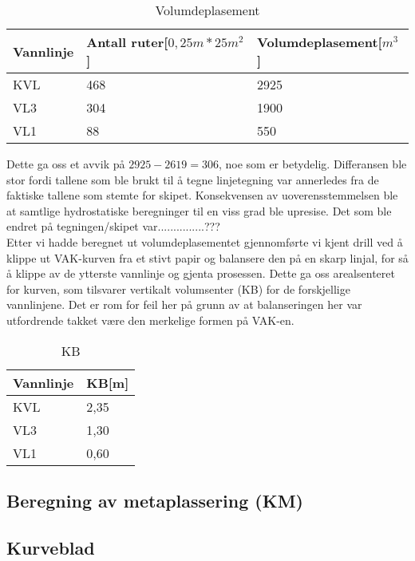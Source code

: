 \documentclass[norsk]{article}
\begin{document}
\begin{table}[htbp]
	\centering
    \caption{Volumdeplasement}
    \label{tab:tableVDP}
    \hskip-3.0cm
    \begin{tabular}{l|l|l} 
      \hline
      \textbf{Vannlinje} &  \textbf{Antall ruter[$0,25m*25m^2$]} & \textbf{Volumdeplasement[$m^3$]} \\ \hline
      KVL & 468 & 2925 \\ \hline
      VL3 & 304 & 1900\\ \hline
      VL1 & 88 & 550 \\ \hline
    \end{tabular}
\end{table}

Dette ga oss et avvik på $2925-2619=306$, noe som er betydelig. Differansen ble stor fordi tallene som ble brukt til å tegne linjetegning var annerledes fra de faktiske tallene som stemte for skipet. Konsekvensen av uoverensstemmelsen ble at samtlige hydrostatiske beregninger til en viss grad ble upresise. Det som ble endret på tegningen/skipet var...............???\\

Etter vi hadde beregnet ut volumdeplasementet gjennomførte vi kjent drill ved å klippe ut VAK-kurven fra et stivt papir og balansere den på en skarp linjal, for så å klippe av de ytterste vannlinje og gjenta prosessen. Dette ga oss arealsenteret for kurven, som tilsvarer vertikalt volumsenter (KB) for de forskjellige vannlinjene. Det er rom for feil her på grunn av at balanseringen her var utfordrende takket være den merkelige formen på VAK-en. \\

\begin{table}[htbp]
	\centering
    \caption{KB}
    \label{tab:tableLCB}
    \hskip-3.0cm
    \begin{tabular}{l|l} 
      \hline
      \textbf{Vannlinje} &  \textbf{KB[m]} \\ \hline
      KVL & 2,35 \\ \hline
      VL3 & 1,30 \\ \hline
      VL1 & 0,60 \\ \hline
    \end{tabular}
\end{table}

  	\subsection{Beregning av metaplassering (KM)}
  	\subsection{Kurveblad}
\end{document}
